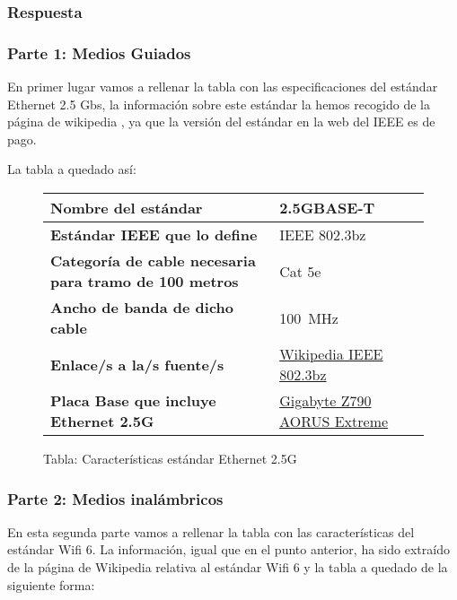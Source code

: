\subsubsection{Respuesta}

\subsubsection*{Parte 1: Medios Guiados}
En primer lugar vamos a rellenar la tabla con las especificaciones del estándar Ethernet 2.5 Gbs, la información sobre este estándar la hemos recogido de la página de wikipedia \cite{wiki01}, ya que la versión del estándar en la web del IEEE es de pago.

La tabla a quedado así:

\begin{figure}[H]

    \vspace{3ex}
    \centering

    \setlength{\tabcolsep}{10pt}
    \renewcommand{\arraystretch}{1.4}

    \begin{tabular}{| l | l |}
        \hline
        \textbf{Nombre del estándar}  & 2.5GBASE-T \\ \hline
        \textbf{Estándar IEEE que lo define} & IEEE 802.3bz   \\ \hline
        \textbf{Categoría de cable necesaria para tramo de 100 metros} & Cat 5e   \\ \hline
        \textbf{Ancho de banda de dicho cable} & 100 MHz    \\ \hline
        \textbf{Enlace/s a la/s fuente/s} & \href{https://es.wikipedia.org/wiki/IEEE_802.3bz_(2.5GBASE-T_y_5GBASE-T)}{Wikipedia IEEE 802.3bz}  \\ \hline
        \textbf{Placa Base que incluye Ethernet 2.5G} & \href{https://www.gigabyte.com/Motherboard/Z790-AORUS-XTREME-rev-10/sp#sp}{Gigabyte Z790 AORUS Extreme}   \\ \hline
    \end{tabular}
    \caption{Tabla: Características estándar Ethernet 2.5G}
\end{figure}

\subsubsection*{Parte 2: Medios inalámbricos}
En esta segunda parte vamos a rellenar la tabla con las características del estándar Wifi 6. La información, igual que en el punto anterior, ha sido extraído de la página de Wikipedia relativa al estándar Wifi 6 \cite{wiki02} y la tabla a quedado de la siguiente forma:

